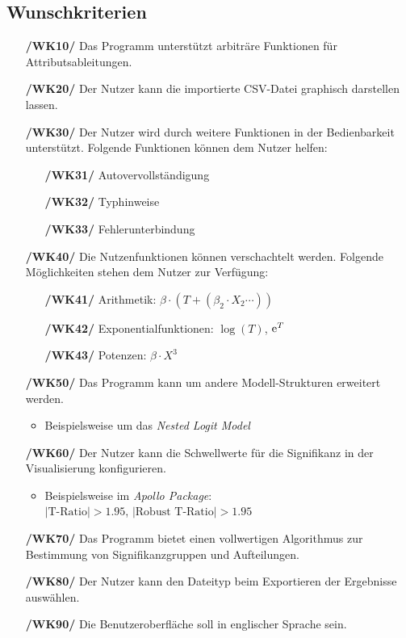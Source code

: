 \documentclass{article}
\begin{document}
\subsection{Wunschkriterien}
\begin{itemize}
    \item[\textbf{/WK10/}] Das Programm unterstützt arbiträre Funktionen für Attributsableitungen.
    \item[\textbf{/WK20/}] Der Nutzer kann die importierte CSV-Datei graphisch darstellen lassen.
    \item[\textbf{/WK30/}] Der Nutzer wird durch weitere Funktionen in der Bedienbarkeit unterstützt. \newline Folgende Funktionen können dem Nutzer helfen:
    \begin{itemize}[leftmargin=.7in]
        \item[\textbf{/WK31/}] Autovervollständigung
        \item[\textbf{/WK32/}] Typhinweise
        \item[\textbf{/WK33/}] Fehlerunterbindung
    \end{itemize}
    \item[\textbf{/WK40/}] Die Nutzenfunktionen können verschachtelt werden.
    \newline Folgende Möglichkeiten stehen dem Nutzer zur Verfügung:
    \begin{itemize}[leftmargin=.7in]
        \item[\textbf{/WK41/}] Arithmetik: $\beta \cdot (T + (\beta_2 \cdot X_2 \cdots))$
        \item[\textbf{/WK42/}] Exponentialfunktionen: $\log(T)$, ${\rm e}^T$
        \item[\textbf{/WK43/}] Potenzen: $\beta \cdot X^3$
    \end{itemize}
    \item[\textbf{/WK50/}] Das Programm kann um andere Modell-Strukturen erweitert werden.
    \begin{itemize}
        \item Beispielsweise um das \emph{Nested Logit Model}
    \end{itemize}
    \item[\textbf{/WK60/}] Der Nutzer kann die Schwellwerte für die Signifikanz in der Visualisierung konfigurieren.
    \begin{itemize}
        \item Beispielsweise im \emph{Apollo Package}:\\
        $|\text{T-Ratio}| > 1.95$, $|\text{Robust T-Ratio}| > 1.95$
    \end{itemize}    
    \item[\textbf{/WK70/}] Das Programm bietet einen vollwertigen Algorithmus zur Bestimmung von Signifikanzgruppen und Aufteilungen.
    \item[\textbf{/WK80/}] Der Nutzer kann den Dateityp beim Exportieren der Ergebnisse auswählen. 
    \item[\textbf{/WK90/}] Die Benutzeroberfläche soll in englischer Sprache sein.
\end{itemize}
\end{document}
